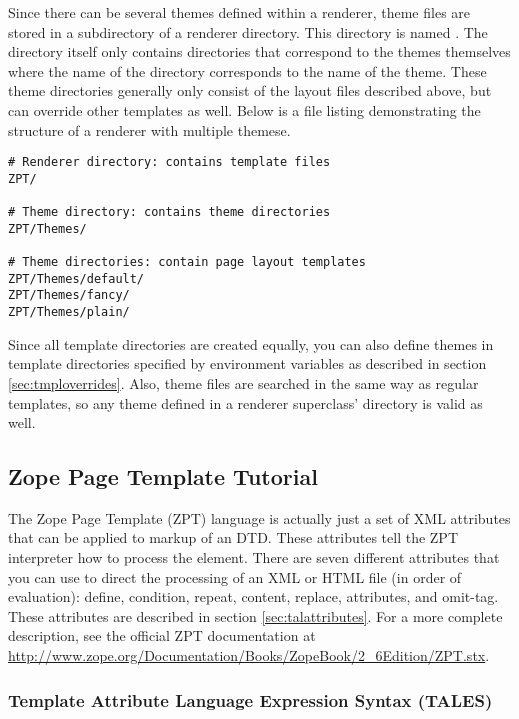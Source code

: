Since there can be several themes defined within a renderer, theme files
are stored in a subdirectory of a renderer directory.  This directory
is named .  The  directory itself only contains
directories that correspond to the themes themselves where the name
of the directory corresponds to the name of the theme.  These theme 
directories generally only consist of the layout files described above,
but can override other templates as well.  Below is a file listing
demonstrating the structure of a renderer with multiple themese.
\begin{verbatim}
# Renderer directory: contains template files
ZPT/

# Theme directory: contains theme directories
ZPT/Themes/

# Theme directories: contain page layout templates
ZPT/Themes/default/
ZPT/Themes/fancy/
ZPT/Themes/plain/
\end{verbatim}

Since all template directories are created equally, you can also define
themes in template directories specified by environment variables as
described in section \ref{sec:tmploverrides}.  Also, theme files are 
searched in the same way as regular templates, so any theme defined
in a renderer superclass' directory is valid as well.


\subsection{Zope Page Template Tutorial\label{sec:zpttutorial}}

The Zope Page Template (ZPT) language is actually just a set of XML
attributes that can be applied to markup of an DTD.  These attributes
tell the ZPT interpreter how to process the element.  There are 
seven different attributes that you can use to direct the processing
of an XML or HTML file (in order of evaluation): define, condition, repeat, 
content, replace, attributes, and omit-tag.  These attributes are
described in section \ref{sec:talattributes}.  For a more complete description,
see the official ZPT documentation at 
\url{http://www.zope.org/Documentation/Books/ZopeBook/2_6Edition/ZPT.stx}.


\subsubsection{Template Attribute Language Expression Syntax (TALES)}

